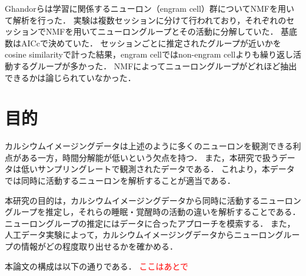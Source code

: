 Ghandorらは学習に関係するニューロン（engram cell）群についてNMFを用いて解析を行った\cite{Ghandour2019}．
実験は複数セッションに分けて行われており，それぞれのセッションでNMFを用いてニューロングループとその活動に分解していた．
基底数はAICcで決めていた．
セッションごとに推定されたグループが近いかをcosine similarityで計った結果，engram cellではnon-engram cellよりも繰り返し活動するグループが多かった．
NMFによってニューロングループがどれほど抽出できるかは論じられていなかった．

\section{目的}
カルシウムイメージングデータは上述のように多くのニューロンを観測できる利点がある一方，時間分解能が低いという欠点を持つ．
また，本研究で扱うデータは低いサンプリングレートで観測されたデータである．
これより，本データでは同時に活動するニューロンを解析することが適当である．

本研究の目的は，カルシウムイメージングデータから同時に活動するニューロングループを推定し，それらの睡眠・覚醒時の活動の違いを解析することである．
ニューロングループの推定にはデータに合ったアプローチを模索する．
また，人工データ実験によって，カルシウムイメージングデータからニューロングループの情報がどの程度取り出せるかを確かめる．

本論文の構成は以下の通りである．
\textcolor{red}{ここはあとで}
